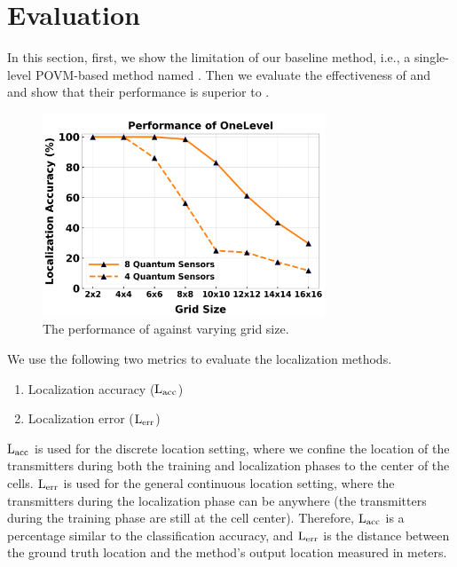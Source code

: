 \section{Evaluation}
\label{evaluation}
\label{sec:quantum_eval}


In this section, first, we show the limitation of our baseline method, i.e., a single-level POVM-based method named \povmone.
Then we evaluate the effectiveness of \povm and \povmpro and show that their performance is superior to \povmone. 

\begin{figure}[t]
    \centering
    \includegraphics[width=0.75\textwidth]{chapters/icc/figures/onelevel-varygrid.png}
    \caption{The performance of \povmone against varying grid size.}
    \label{fig:povmloc-onelevel}
\end{figure}

 We use the following two metrics to evaluate the localization methods.
\begin{enumerate}
    \item Localization accuracy ($\mathrm{L_{acc}}$)
    \item Localization error ($\mathrm{L_{err}}$)
\end{enumerate}
$\mathrm{L_{acc}}$ is used for the discrete location setting, where we confine the location of the transmitters during both the training and localization phases to the center of the cells.
$\mathrm{L_{err}}$ is used for the general continuous location setting, where the transmitters during the localization phase can be anywhere (the transmitters during the training phase are still at the cell center).
Therefore, $\mathrm{L_{acc}}$ is a percentage similar to the classification accuracy, and $\mathrm{L_{err}}$ is the distance between the ground truth location and the method's output location measured in meters.

